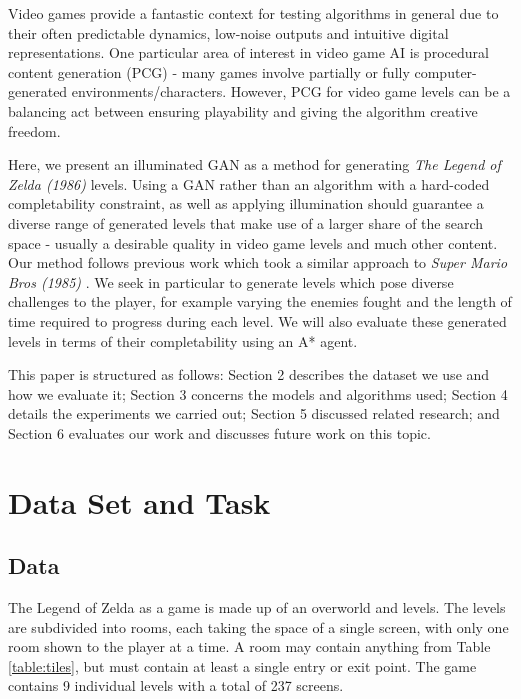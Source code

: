 \documentclass{article}
\begin{document}
Video games provide a fantastic context for testing algorithms in general due to their often predictable dynamics, low-noise outputs and intuitive digital representations. One particular area of interest in video game AI is procedural content generation (PCG) - many games involve partially or fully computer-generated environments/characters. However, PCG for video game levels can be a balancing act between ensuring playability and giving the algorithm creative freedom.

Here, we present an illuminated GAN as a method for generating \textit{The Legend of Zelda (1986)} levels. Using a GAN rather than an algorithm with a hard-coded completability constraint, as well as applying illumination should guarantee a diverse range of generated levels that make use of a larger share of the search space - usually a desirable quality in video game levels and much other content. Our method follows previous work which took a similar approach to \textit{Super Mario Bros (1985)} \cite{Fontaine2020}. We seek in particular to generate levels which pose diverse challenges to the player, for example varying the enemies fought and the length of time required to progress during each level. We will also evaluate these generated levels in terms of their completability using an A* agent.

This paper is structured as follows: Section 2 describes the dataset we use and how we evaluate it; Section 3 concerns the models and algorithms used; Section 4 details the experiments we carried out; Section 5 discussed related research; and Section 6 evaluates our work and discusses future work on this topic.


\section{Data Set and Task} 
\subsection{Data}
The Legend of Zelda as a game is made up of an overworld and levels. The levels are subdivided into rooms, each taking the space of a single screen, with only one room shown to the player at a time. A room may contain anything from Table \ref{table:tiles}, but must contain at least a single entry or exit point. The game contains 9 individual levels with a total of 237 screens.
\end{document}
